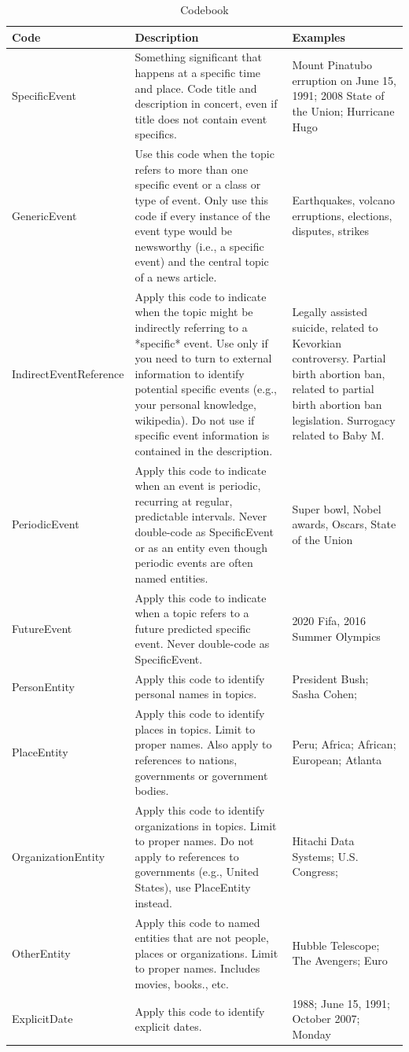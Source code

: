 \documentclass{sig-alternate}
\begin{document}
\begin{table}[H]
\small
\begin{tabular}{| l | p{7cm}  | p{7cm}  |} \hline
\bf{Code} & \bf{Description} & \bf{Examples}  \\ \hline
SpecificEvent & Something significant that happens at a specific time and place. Code title and description in concert, even if title does not contain event specifics. & Mount Pinatubo erruption on June 15, 1991; 2008 State of the Union; Hurricane Hugo \\ \hline
GenericEvent & Use this code when the topic refers to more than one specific event or a class or type of event. Only use this code if every instance of the event type would be newsworthy (i.e., a specific event) and the central topic of a news article. & Earthquakes, volcano erruptions, elections, disputes, strikes \\ \hline
IndirectEventReference & Apply this code to indicate when the topic might be indirectly referring to a *specific* event. Use only if you need to turn to external information to identify potential specific events (e.g., your personal knowledge, wikipedia). Do not use if specific event information is contained in the description. & Legally assisted suicide, related to Kevorkian controversy. Partial birth abortion ban, related to partial birth abortion ban legislation. Surrogacy related to Baby M. \\ \hline
PeriodicEvent & Apply this code to indicate when an event is periodic, recurring at regular, predictable intervals. Never double-code as SpecificEvent or as an entity even though periodic events are often named entities. & Super bowl, Nobel awards, Oscars, State of the Union \\ \hline
FutureEvent & Apply this code to indicate when a topic refers to a future predicted specific event. Never double-code as SpecificEvent. & 2020 Fifa, 2016 Summer Olympics \\ \hline
PersonEntity & Apply this code to identify personal names in topics. & President Bush; Sasha Cohen;  \\ \hline
PlaceEntity & Apply this code to identify places in topics. Limit to proper names. Also apply to references to nations, governments or government bodies. & Peru; Africa; African; European; Atlanta \\ \hline
OrganizationEntity & Apply this code to identify organizations in topics. Limit to proper names. Do not apply to references to governments (e.g., United States), use PlaceEntity instead. & Hitachi Data Systems; U.S. Congress; \\ \hline
OtherEntity & Apply this code to named entities that are not people, places or organizations. Limit to proper names. Includes movies, books., etc. & Hubble Telescope; The Avengers; Euro	\\ \hline
ExplicitDate & Apply this code to identify explicit dates. & 1988; June 15, 1991; October 2007; Monday \\ \hline
\end{tabular}
\caption{Codebook}
\label{table.codebook}
\end{table}
\end{document}
